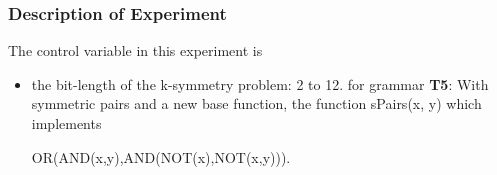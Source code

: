 \begin{frame}
\frametitle{
Description of Experiment
}
The control variable in this experiment is
\begin{itemize}
\item the bit-length of the k-symmetry problem: 2 to 12.
       for grammar
       {\bf T5}: With symmetric pairs and a new base function,
       the function sPairs(x, y) which implements
 
 OR(AND(x,y),AND(NOT(x),NOT(x,y))).
\end{itemize}
\end{frame}